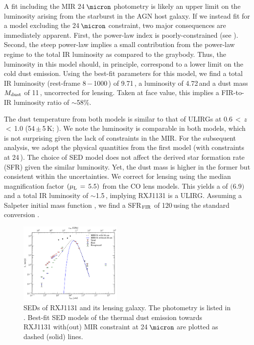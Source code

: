 \documentclass[]{emulateapj}
\begin{document}
A fit including the MIR 24\,$\micron$ photometry
is likely an upper limit on the \fir luminosity arising from the starburst
in the AGN host galaxy.
If we instead fit for a model excluding the 24\,$\micron$ constraint,
two major consequences are immediately apparent.
First, the power-law index is poorly-constrained (see ).
Second, the steep power-law implies a small contribution
from the power-law regime
to the total IR luminosity as compared to the graybody.
Thus, the \fir luminosity in
this model should, in principle, correspond to a
lower limit on the cold dust emission.
Using the best-fit parameters
for this model, we find a total IR luminosity
\LIR (rest-frame 8\,$-$\,1000\,\micron) of 9.71\,\Lsun,
a \fir luminosity \LFIR of 4.72\,\Lsun and a
dust mass $M_{\rm dust}$ of 11\,\Msun, uncorrected for lensing.
Taken at face value, this implies a FIR-to-IR luminosity ratio
of $\sim$58\%.

The dust temperature from both models is similar to that of
ULIRGs at 0.6\,$<$\,$z$\,$<$\,1.0 (54\,$\pm$\,5\,K;
\citealt[hereafter C13]{Combes13a}).
We note the \fir luminosity is comparable in both models, which is
not surprising given the lack of constraints in the MIR.
For the subsequent analysis, we adopt the physical quantities
from the first model (\ie with constraints at 24\,\micron).
The choice of SED model does not affect
the derived star formation rate (SFR) given the similar \fir luminosity.
Yet, the dust mass is higher in the former but consistent within the
uncertainties.
We correct for lensing using the median magnification
factor $(\mu_{\rm L}\,=\,5.5)$
from the CO lens models. This yields a
 \LFIR of $($6.9$)$\,\Lsun
 and
 a total IR luminosity of $\sim$1.5\,\Lsun,  implying RXJ1131 is a ULIRG.
Assuming a Salpeter initial
mass function \citep{Salpeter55a}, we find a
SFR$_{\rm FIR}$ of 120\,\sfrU using the
standard conversion \citep{Kennicutt98a}.
\begin{figure}[!htbp]
\centering
\includegraphics[trim=5 5 5 5, clip, width=0.45\textwidth]{../Figures/FullSED}
\caption{SEDs of RXJ1131 and its lensing galaxy. The photometry is listed in .
Best-fit SED models of the thermal dust emission towards RXJ1131
with(out) MIR constraint at 24\,$\micron$ are plotted as dashed (solid) lines.
\label{fig:SED}}
\end{figure}
\end{document}
